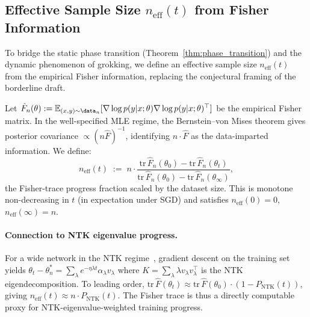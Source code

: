 
\subsection{Effective Sample Size $n_{\text{eff}}(t)$ from Fisher Information}
\label{sec:n_eff}

To bridge the static phase transition (Theorem~\ref{thm:phase_transition}) and the dynamic phenomenon of grokking, we define an effective sample size $n_{\text{eff}}(t)$ from the empirical Fisher information, replacing the conjectural framing of the borderline draft.

Let $\hat F_n(\theta) := \mathbb{E}_{(x,y)\sim \data_n}[ \nabla \log p(y|x;\theta)\nabla \log p(y|x;\theta)^\top ]$ be the empirical Fisher matrix. In the well-specified MLE regime, the Bernstein--von Mises theorem gives posterior covariance $\propto (n \hat F)^{-1}$, identifying $n \cdot \hat F$ as the data-imparted information. We define:
\begin{equation}
\label{eq:n_eff}
n_{\text{eff}}(t) \;:=\; n \cdot \frac{\mathrm{tr}\,\hat F_n(\theta_0) - \mathrm{tr}\,\hat F_n(\theta_t)}{\mathrm{tr}\,\hat F_n(\theta_0) - \mathrm{tr}\,\hat F_n(\theta_\infty)} ,
\end{equation}
the Fisher-trace progress fraction scaled by the dataset size. This is monotone non-decreasing in $t$ (in expectation under SGD) and satisfies $n_{\text{eff}}(0) = 0$, $n_{\text{eff}}(\infty) = n$.

\paragraph{Connection to NTK eigenvalue progress.}
For a wide network in the NTK regime~\citep{jacot2018ntk}, gradient descent on the training set yields
$\theta_t - \theta^*_n = \sum_\lambda e^{-\eta\lambda t}\alpha_\lambda v_\lambda$
where $K = \sum_\lambda \lambda v_\lambda v_\lambda^\top$ is the NTK eigendecomposition.
To leading order, $\mathrm{tr}\,\hat F(\theta_t) \approx \mathrm{tr}\,\hat F(\theta_0)\cdot(1 - P_{\text{NTK}}(t))$, giving $n_{\text{eff}}(t) \approx n\cdot P_{\text{NTK}}(t)$.
The Fisher trace is thus a directly computable proxy for NTK-eigenvalue-weighted training progress.

